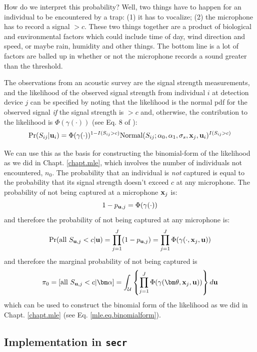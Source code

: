 How do we interpret this probability? Well, two things have to happen
for an individual to be encountered by a trap: (1) it has to vocalize;
(2) the microphone has to record a signal $>c$. These two things
together are a product of biological and environmental factors which
could include time of day, wind direction and speed, or maybe rain,
humidity and other things. The bottom line is a lot of factors are
balled up in whether or not the microphone records a sound greater
than the threshold.

The observations from an acoustic survey are the signal strength
measurements, and the likelihood of the observed signal strength from
individual $i$ at detection device $j$ can be specified by noting that
the likelihood is the normal pdf for the observed signal {\it if} the
signal strength is $>c$ and, otherwise, the contribution to the
likelihood is $\Phi(\gamma(\cdot))$ (see Eq. 8 of
\citet{efford_etal:2009ecol}):
\[
\Pr(S_{ij}| {\bf u}_{i} ) = \Phi( \gamma( \cdot) )^{1-I(S_{ij}>c)}
\mbox{Normal}(S_{ij};\alpha_{0},\alpha_{1},\sigma_{s},{\bf x}_{j},{\bf
u}_{i})^{I(S_{ij}>c)}
\]

We can use this as the basis for constructing the binomial-form of the
likelihood as we did in Chapt. \ref{chapt.mle}, which involves the
number of individuals not encountered, $n_{0}$.  The probability that
an individual is {\it not} captured is equal to the probability that
its signal strength doesn't exceed $c$ at any microphone.  The
probability of not being captured at a microphone ${\bf x}_{j}$ is:
\[
1-p_{{\bf u},j} = \Phi( \gamma(\cdot) )
\]
and therefore the probability of not being captured at any microphone is:
\[
\Pr(\mbox{all } S_{{\bf u},j} < c | {\bf u}) = \prod_{j=1}^{J} ( 1-p_{{\bf u},j} )
= \prod_{j=1}^{J} \Phi( \gamma(\cdot, {\bf x}_{j}, {\bf u}) )
\]
and therefore the marginal probability of not being captured is
\[
\pi_{0} = [ \mbox{all }  S_{{\bf u},j} < c | {\bm \alpha}] =
\int_{{\cal U}}
 \left\{
\prod_{j=1}^{J} \Phi( \gamma( {\bm \theta}, {\bf x}_{j}, {\bf u}) )
 \right\}
 d{\bf u}
\]
which can be used to construct the binomial form of the likelihood as
we did in Chapt. \ref{chapt.mle} (see Eq. \ref{mle.eq.binomialform}).



\subsection{Implementation in \mbox{\tt secr}}

